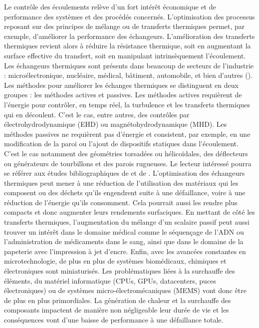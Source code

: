 Le contrôle des écoulements relève d'un fort intérêt économique et de performance des systèmes et des procédés concernés. L'optimisation des processus reposant sur des principes de mélange ou de transferts thermiques permet, par exemple, d'améliorer la performance des échangeurs. L'amélioration des transferts thermiques revient alors à réduire la résistance thermique, soit en augmentant la surface effective du transfert, soit en manipulant intrinsèquement l'écoulement. Les échangeurs thermiques sont présents dans beaucoup de secteurs de l'industrie : microélectronique, nucléaire, médical, bâtiment, automobile, et bien d'autres (\cite{Mousa2021}). Les méthodes pour améliorer les échanges thermiques se distinguent en deux groupes : les méthodes actives et passives. Les méthodes actives requièrent de l'énergie pour contrôler, en temps réel, la turbulence et les transferts thermiques qui en découlent. C'est le cas, entre autres, des contrôles par électrohydrodynamique (EHD) ou magnétohydrodynamique (MHD). Les méthodes passives ne requièrent pas d'énergie et consistent, par exemple, en une modification de la paroi ou l'ajout de dispositifs statiques dans l'écoulement. C'est le cas notamment des géométries torsadées ou hélicoïdales, des déflecteurs ou générateurs de tourbillons et des parois rugueuses. Le lecteur intéressé pourra se référer aux études bibliographiques de \cite{Sheikholeslami2015} et de \cite{Maradiya2018}. L'optimisation des échangeurs thermiques peut mener à une réduction de l'utilisation des matériaux qui les composent ou des déchets qu'ils engendrent suite à une défaillance, voire à une réduction de l'énergie qu'ils consomment. Cela pourrait aussi les rendre plus compacts et donc augmenter leurs rendements surfaciques. En mettant de côté les transferts thermiques, l'augmentation du mélange d'un scalaire passif peut aussi trouver un intérêt dans le domaine médical comme le séquençage de l'ADN ou l'administration de médicaments dans le sang, ainsi que dans le domaine de la papeterie avec l'impression à jet d'encre. Enfin, avec les avancées constantes en microtechnologie, de plus en plus de systèmes biomédicaux, chimiques et électroniques sont miniaturisés. Les problématiques liées à la surchauffe des éléments, du matériel informatique (CPUs, GPUs, datacenters, puces électroniques) ou de systèmes micro-électromécaniques (MEMS) vont donc être de plus en plus primordiales. La génération de chaleur et la surchauffe des composants impactent de manière non négligeable leur durée de vie et les conséquences vont d’une baisse de performance à une défaillance totale.\\


